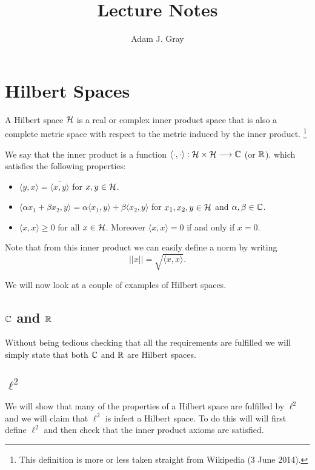 \documentclass{unswmaths}
\begin{document}
\author{Adam J. Gray}
\title{Lecture Notes}
\subject{Functional Analysis}

\unswtitle

\section*{Hilbert Spaces}

\begin{definition}
	A Hilbert space $ \mathcal{H} $ is a real or complex inner product space that is also a complete
	metric space with respect to the metric induced by the inner product. 
	\footnote{This definition is more or less taken straight from Wikipedia (3 June 2014).}
\end{definition}
	We say that the inner product is a function $ \langle \cdot , \cdot \rangle : \mathcal{H} \times \mathcal{H} \longrightarrow \mathbb{C} $ (or $ \mathbb{R} $).
	which satisfies the following properties:
	\begin{itemize}
		\item $ \langle y, x \rangle = \overline{\langle x, y \rangle }$ for $ x, y \in \mathcal{H} $.
		\item $ \langle \alpha x_1 + \beta x_2, y \rangle = \alpha \langle x_1, y \rangle + \beta \langle x_2, y \rangle $ for $ x_1, x_2, y \in \mathcal{H} $ and $ \alpha, \beta \in \mathbb{C} $.
		\item $ \langle x, x \rangle \geq 0 $ for all $ x \in \mathcal{H} $. Moreover $ \langle x, x \rangle = 0 $ if and only if $ x = 0 $.
	\end{itemize}
	Note that from this inner product we can easily define  a norm by writing 
	$$ ||x|| = \sqrt{\langle x, x \rangle}. $$
	
	We will now look at a couple of examples of Hilbert spaces.
	
\subsection*{ $ \mathbb{C} $ and $ \mathbb{R} $} 
	Without being tedious checking that all the requirements are fulfilled we will simply state that both $ \mathbb{C} $ and $ \mathbb{R} $
	are Hilbert spaces.

\subsection*{ $ \ell^2 $ }
	We will show that many of the properties of a Hilbert space are fulfilled by $ \ell^2 $ and we will
	claim that $ \ell^2 $ is infect a Hilbert space. To do this will will first define $ \ell^2 $ and then
	check that the inner product axioms are satisfied.
	
\end{document}
